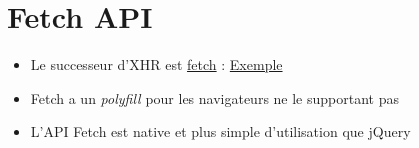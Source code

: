 \begin{otherlanguage}{english}

\begin{Shaded}
\begin{Highlighting}[]
\OperatorTok{=} \NormalTok{(}\NormalTok{)}\OperatorTok{;}
\NormalTok{(}\NormalTok{)}\OperatorTok{;}
\end{Highlighting}
\end{Shaded}

\end{otherlanguage}

\hypertarget{fetch-api}{%
\section{Fetch API}\label{fetch-api}}

\begin{itemize}
\tightlist
\item
  Le successeur d'XHR est \href{https://fetch.spec.whatwg.org/}{fetch} :
  \href{https://developer.mozilla.org/fr/docs/Web/API/Fetch_API/Using_Fetch}{Exemple}
\item
  Fetch a un \emph{polyfill} pour les navigateurs ne le supportant pas
\item
  L'API Fetch est native et plus simple d'utilisation que jQuery
\end{itemize}

\begin{otherlanguage}{english}

\begin{Shaded}
\begin{Highlighting}[]
\NormalTok{(}\NormalTok{)}
\NormalTok{(}\OperatorTok{\{}
         \NormalTok{()}
    \OperatorTok{\}}\NormalTok{)}
\NormalTok{(}\OperatorTok{\{}
        \OperatorTok{;}
    \OperatorTok{\}}\NormalTok{)}
\NormalTok{(}\OperatorTok{\{}
        \NormalTok{(}\OperatorTok{,}
    \OperatorTok{\}}\NormalTok{)}
\end{Highlighting}
\end{Shaded}

\end{otherlanguage}

